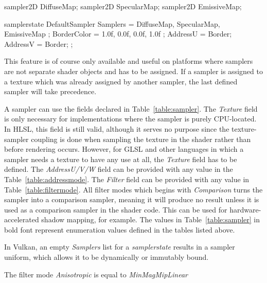 \documentclass{article}
\begin{document}
\begin{CodeBox}
sampler2D DiffuseMap;
sampler2D SpecularMap;
sampler2D EmissiveMap;

samplerstate DefaultSampler
{
	Samplers = { DiffuseMap, SpecularMap, EmissiveMap }; 
	BorderColor = { 1.0f, 0.0f, 0.0f, 1.0f };
	AddressU = Border;
	AddressV = Border;
};
\end{CodeBox}

This feature is of course only available and useful on platforms where samplers are not separate shader objects and has to be assigned. If a sampler is assigned to a texture which was already assigned by another sampler, the last defined sampler will take precedence. 

A sampler can use the fields declared in Table~\ref{table:sampler}. The \textit{Texture} field is only necessary for implementations where the sampler is purely CPU-located. In HLSL, this field is still valid, although it serves no purpose since the texture-sampler coupling is done when sampling the texture in the shader rather than before rendering occurs. However, for GLSL and other languages in which a sampler needs a texture to have any use at all, the \textit{Texture} field has to be defined. The \textit{AddressU/V/W} field can be provided with any value in the Table~\ref{table:addressmode}. The \textit{Filter} field can be provided with any value in Table~\ref{table:filtermode}. All filter modes which begins with \textit{Comparison} turns the sampler into a comparison sampler, meaning it will produce no result unless it is used as a comparison sampler in the shader code. This can be used for hardware-accelerated shadow mapping, for example. The values in Table~\ref{table:sampler} in bold font represent enumeration values defined in the tables listed above.

In Vulkan, an empty \textit{Samplers} list for a \textit{samplerstate} results in a sampler uniform, which allows it to be dynamically or immutably bound.

The filter mode \textit{Anisotropic} is equal to \textit{MinMagMipLinear}
\end{document}
